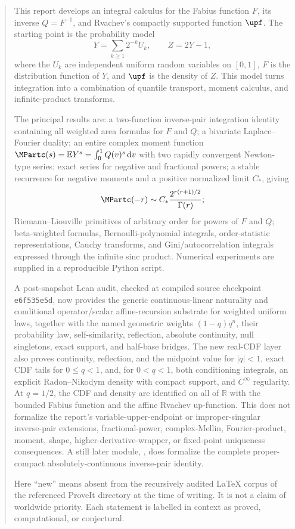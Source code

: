 \documentclass[11pt,oneside]{article}
\theoremstyle{definition}
\theoremstyle{remark}
\newcommand{\F}{F}
\newcommand{\Q}{Q}
\newcommand{\E}{\mathbb E}
\newcommand{\R}{\mathbb R}
\newcommand{\dd}{\,\mathrm d}
\newcommand{\1}{\mathbf 1}
\begin{document}
\begin{abstract}
This report develops an integral calculus for the Fabius function \(\F\), its inverse
\(\Q=\F^{-1}\), and Rvachev's compactly supported function \(\upf\).  The starting
point is the probability model
\[
  Y=\sum_{k\ge1}2^{-k}U_k,\qquad Z=2Y-1,
\]
where the \(U_k\) are independent uniform random variables on \([0,1]\), \(\F\) is
the distribution function of \(Y\), and \(\upf\) is the density of \(Z\).  This model
turns integration into a combination of quantile transport, moment calculus, and
infinite-product transforms.

The principal results are: a two-function inverse-pair integration identity containing
all weighted area formulas for \(\F\) and \(\Q\); a bivariate Laplace--Fourier duality;
an entire complex moment function \(\MPartc(s)=\E Y^s=\int_0^1\Q(v)^s\dd v\) with two
rapidly convergent Newton-type series; exact series for negative and fractional powers;
a stable recurrence for negative moments and a positive normalized limit
\(C_*\), giving
\[
  \MPartc(-r)\sim C_*\frac{2^{r(r+1)/2}}{\Gamma(r)};
\]
Riemann--Liouville primitives of arbitrary order for powers of \(\F\) and \(\Q\);
beta-weighted formulas, Bernoulli-polynomial integrals, order-statistic representations,
Cauchy transforms, and Gini/autocorrelation integrals expressed through the infinite
sinc product.  Numerical experiments are supplied in a reproducible Python script.

A post-snapshot Lean audit, checked at compiled source checkpoint
\texttt{e6f535e5d}, now provides the generic continuous-linear naturality and conditional
operator/scalar affine-recursion substrate for weighted uniform laws, together with the
named geometric weights \((1-q)q^n\), their probability law, self-similarity, reflection,
absolute continuity, null singletons, exact support, and half-base bridges.  The new real-CDF
layer also proves continuity, reflection, and the midpoint value for \(|q|<1\), exact CDF
tails for \(0\le q<1\), and, for \(0<q<1\), both conditioning integrals, an explicit
Radon--Nikodym density with compact support, and \(C^\infty\) regularity.  At \(q=1/2\),
the CDF and density are identified on all of \(\R\) with the bounded Fabius function and
the affine Rvachev up-function.  This does not formalize the report's
variable-upper-endpoint or improper-singular inverse-pair extensions, fractional-power,
complex-Mellin, Fourier-product, moment, shape, higher-derivative-wrapper, or fixed-point
uniqueness consequences.  A still later module, , does
formalize the complete proper-compact absolutely-continuous inverse-pair identity.

Here ``new'' means absent from the recursively audited LaTeX corpus of the referenced
ProveIt directory at the time of writing.  It is not a claim of worldwide priority.
Each statement is labelled in context as proved, computational, or conjectural.
\end{abstract}
\end{document}
